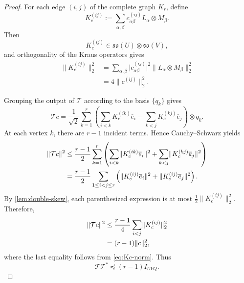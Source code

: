 \documentclass[11pt,reqno]{amsart}
\theoremstyle{remark}
\newcommand{\norm}[1]{\lVert #1\rVert}
\newcommand{\abs}[1]{\lvert #1\rvert}
\begin{document}
\begin{proof}
For each edge $(i,j)$ of the complete graph $K_r$, define
\[
    K_c^{(ij)}
    :=
    \sum_{\alpha,\beta}
    c_{\alpha\beta}^{(ij)}
    L_\alpha\otimes M_\beta.
\]
Then
\[
    K_c^{(ij)}
    \in
    \mathfrak{so}(U)\otimes\mathfrak{so}(V),
\]
and orthogonality of the Kraus operators gives
\begin{equation}
\label{eq:Kc-norm}
\begin{aligned}
    \norm{K_c^{(ij)}}_2^2
    &=
    \sum_{\alpha,\beta}
    \abs{c_{\alpha\beta}^{(ij)}}^2
    \norm{L_\alpha\otimes M_\beta}_2^2\\
    &=
    4\norm{c^{(ij)}}_2^2.
\end{aligned}
\end{equation}

Grouping the output of $\mathcal T$ according to the basis
$\{q_k\}$ gives
\begin{equation}
\label{eq:T-by-vertices}
    \mathcal Tc
    =
    \frac1{\sqrt2}
    \sum_{k=1}^r
    \left(
      \sum_{i<k}K_c^{(ik)}\overline e_i
      -
      \sum_{k<j}K_c^{(kj)}\overline e_j
    \right)
    \otimes q_k.
\end{equation}
At each vertex $k$, there are $r-1$ incident terms. Hence
Cauchy--Schwarz yields
\begin{align}
    \norm{\mathcal Tc}^2
    &\le
    \frac{r-1}{2}
    \sum_{k=1}^r
    \left(
      \sum_{i<k}
      \norm{K_c^{(ik)}\overline e_i}^2
      +
      \sum_{k<j}
      \norm{K_c^{(kj)}\overline e_j}^2
    \right)
    \notag\\
    &=
    \frac{r-1}{2}
    \sum_{1\le i<j\le r}
    \left(
      \norm{K_c^{(ij)}\overline e_i}^2
      +
      \norm{K_c^{(ij)}\overline e_j}^2
    \right).
\label{eq:T-Cauchy}
\end{align}
By \cref{lem:double-skew}, each parenthesized expression is at most
$\frac12\norm{K_c^{(ij)}}_2^2$. Therefore,
\begin{align}
    \norm{\mathcal Tc}^2
    &\le
    \frac{r-1}{4}
    \sum_{i<j}
    \norm{K_c^{(ij)}}_2^2
    \notag\\
    &=
    (r-1)\norm{c}_2^2,
\label{eq:T-operator-bound}
\end{align}
where the last equality follows from \cref{eq:Kc-norm}. Thus
\[
    \mathcal T\mathcal T^*
    \preceq
    (r-1)I_{UVQ}.
\]


\end{proof}
\end{document}
